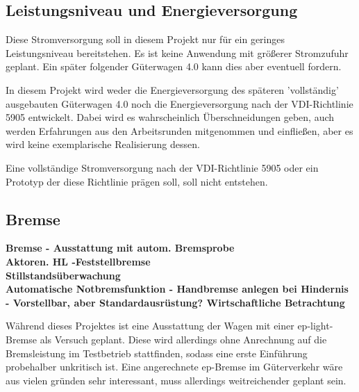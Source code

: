 \subsection{Leistungsniveau und Energieversorgung}
Diese Stromversorgung soll in diesem Projekt nur für ein geringes Leistungsniveau bereitstehen. Es ist keine Anwendung mit größerer Stromzufuhr geplant. Ein später folgender Güterwagen 4.0  kann dies aber eventuell fordern.\par
In diesem Projekt wird weder die Energieversorgung des späteren 'vollständig' ausgebauten Güterwagen 4.0 noch die Energieversorgung nach der VDI-Richtlinie 5905 entwickelt. Dabei wird es wahrscheinlich Überschneidungen geben, auch werden Erfahrungen aus den Arbeitsrunden mitgenommen und einfließen, aber es wird keine exemplarische Realisierung dessen.\par
Eine vollständige Stromversorgung nach der VDI-Richtlinie 5905 oder ein Prototyp der diese Richtlinie prägen soll, soll nicht entstehen. 

\subsection{Bremse}
\textbf{Bremse - Ausstattung mit autom. Bremsprobe\\
Aktoren. HL -Feststellbremse\\
Stillstandsüberwachung\\
Automatische Notbremsfunktion - Handbremse anlegen bei Hindernis - Vorstellbar, aber Standardausrüstung? Wirtschaftliche Betrachtung}\par
Während dieses Projektes ist eine Ausstattung der Wagen mit einer ep-light-Bremse als Versuch geplant. Diese wird allerdings ohne Anrechnung auf die Bremsleistung im Testbetrieb stattfinden, sodass eine erste Einführung probehalber unkritisch ist. Eine angerechnete ep-Bremse im Güterverkehr wäre aus vielen gründen sehr interessant, muss allerdings weitreichender geplant sein.\par

